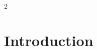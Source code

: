 \documentclass[smallcondensed]{svjour3}     %
\begin{document}
\listoftodos



\newpage
\begin{multicols}{2}
	\printnomenclature
\end{multicols}

\section{Introduction} \label{intro}


\end{document}
